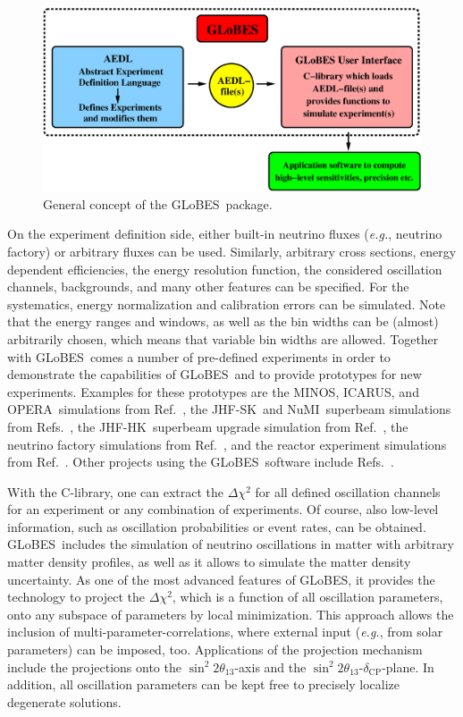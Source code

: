\documentclass[12pt,a4paper]{article}
\newcommand{\eg}{{\it e.g.}}
\newcommand{\Ref}{Ref.}
\newcommand{\Refs}{Refs.}
\newcommand{\deltacp}{\delta_{\mathrm{CP}}}
\newcommand{\stheta}{\sin^2 2 \theta_{13}}
\newcommand{\MINOS}{{\sf MINOS}}
\newcommand{\ICARUS}{{\sf ICARUS}}
\newcommand{\OPERA}{{\sf OPERA}}
\newcommand{\JHFSK}{{\sf JHF-SK}}
\newcommand{\NUMI }{{\sf NuMI}}
\newcommand{\JHFHK}{{\sf JHF-HK}}
\newcommand{\GLOBES}{{\sf GLoBES}}
\begin{document}
\begin{figure}[t]
\begin{center}
\includegraphics[width=16cm]{GLOBES}
\end{center}
\caption{\label{fig:GLOBES} General concept of the \GLOBES\ package.}
\end{figure}

On the experiment definition side, either built-in neutrino fluxes
(\eg, neutrino factory) or arbitrary fluxes can be used. Similarly,
arbitrary cross sections, energy dependent efficiencies, the
energy resolution function, the considered oscillation channels, 
backgrounds, and many other features can be specified. 
For the systematics, energy
normalization and calibration errors can be simulated. Note that
the energy ranges and windows, as well as the bin widths can be
(almost) arbitrarily chosen, which means that variable bin
widths are allowed. Together with \GLOBES\ comes a number of
pre-defined experiments in order to demonstrate the capabilities
of \GLOBES\ and to provide prototypes for new experiments.
Examples for these prototypes are the \MINOS , \ICARUS , and
\OPERA\ simulations from \Ref~\cite{Huber:2004ug}, the
\JHFSK\ and \NUMI\ superbeam simulations from \Refs~\cite{Huber:2002mx,
Huber:2002rs}, the \JHFHK\ superbeam upgrade simulation from
\Ref~\cite{Huber:2002mx}, the neutrino factory simulations from
\Ref~\cite{Huber:2002mx}, and the reactor experiment simulations from
\Ref~\cite{Huber:2003pm}. Other projects using the \GLOBES\ 
software include \Refs~\cite{Huber:2003ak,Ohlsson:2003ip,Winter:2003ye,Antusch:2004yx}.

With the C-library, one can extract the $\Delta \chi^2$ for all defined 
oscillation channels for an experiment or any combination of experiments.
Of course, also low-level information, such as oscillation
probabilities or event rates, can be obtained. \GLOBES\ includes the
simulation of neutrino oscillations in matter with arbitrary matter 
density profiles, as well as it allows to simulate the matter density
uncertainty. As one of the most
advanced features of \GLOBES , it provides the technology to 
project the $\Delta \chi^2$, which is a function of all oscillation
parameters, onto any subspace of parameters by local minimization. 
This approach allows the inclusion of multi-parameter-correlations,
where external input (\eg, from solar parameters) can be imposed, too.
Applications of the projection mechanism include the projections onto the $\stheta$-axis and the $\stheta$-$\deltacp$-plane. In addition, all oscillation parameters can be kept free to precisely localize 
degenerate solutions.
\end{document}
